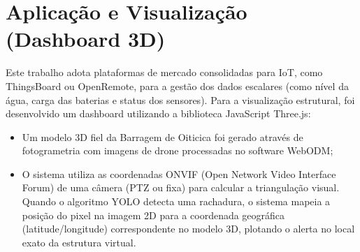 \section{Aplicação e Visualização (Dashboard 3D)}
Este trabalho adota plataformas de mercado consolidadas para IoT, como ThingsBoard ou OpenRemote, para a gestão dos dados escalares (como nível da água, carga das baterias e status dos sensores). Para a visualização estrutural, foi desenvolvido um dashboard utilizando a biblioteca JavaScript Three.js:
\begin{itemize}
    \item Um modelo 3D fiel da Barragem de Oiticica foi gerado através de fotogrametria com imagens de drone processadas no software WebODM;
    \item O sistema utiliza as coordenadas ONVIF (Open Network Video Interface Forum) de uma câmera (PTZ ou fixa) para calcular a triangulação visual. Quando o algoritmo YOLO detecta uma rachadura, o sistema mapeia a posição do pixel na imagem 2D para a coordenada geográfica (latitude/longitude) correspondente no modelo 3D, plotando o alerta no local exato da estrutura virtual.
\end{itemize}
